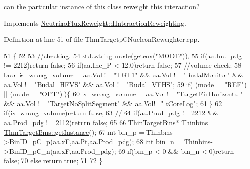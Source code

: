 can the particular instance of this class reweight this interaction? 



Implements \hyperlink{class_neutrino_flux_reweight_1_1_i_interaction_reweighting_aa3d1d3f37a93b02e447cf5eca333ac8d}{Neutrino\-Flux\-Reweight\-::\-I\-Interaction\-Reweighting}.



Definition at line 51 of file Thin\-Targetp\-C\-Nucleon\-Reweighter.\-cpp.


\begin{DoxyCode}
51                                                                           \{
52 
53     \textcolor{comment}{//checking:}
54     std::string mode(getenv(\textcolor{stringliteral}{"MODE"}));
55     \textcolor{keywordflow}{if}(aa.Inc\_pdg != 2212)\textcolor{keywordflow}{return} \textcolor{keyword}{false};
56     \textcolor{keywordflow}{if}(aa.Inc\_P < 12.0)\textcolor{keywordflow}{return} \textcolor{keyword}{false};
57     \textcolor{comment}{//volume check: }
58     \textcolor{keywordtype}{bool} is\_wrong\_volume = aa.Vol != \textcolor{stringliteral}{"TGT1"} && aa.Vol != \textcolor{stringliteral}{"BudalMonitor"} && aa.Vol != \textcolor{stringliteral}{"Budal\_HFVS"} && aa.Vol
       != \textcolor{stringliteral}{"Budal\_VFHS"};
59     \textcolor{keywordflow}{if}( (mode==\textcolor{stringliteral}{"REF"}) || (mode==\textcolor{stringliteral}{"OPT"}) )\{
60       is\_wrong\_volume = aa.Vol != \textcolor{stringliteral}{"TargetFinHorizontal"} && aa.Vol != \textcolor{stringliteral}{"TargetNoSplitSegment"} && aa.Vol!=\textcolor{stringliteral}{"
      tCoreLog"};
61     \}
62     \textcolor{keywordflow}{if}(is\_wrong\_volume)\textcolor{keywordflow}{return} \textcolor{keyword}{false};
63     \textcolor{comment}{//}
64     \textcolor{keywordflow}{if}(aa.Prod\_pdg != 2212 && aa.Prod\_pdg != 2112)\textcolor{keywordflow}{return} \textcolor{keyword}{false};
65     
66     ThinTargetBins*  Thinbins =  \hyperlink{class_neutrino_flux_reweight_1_1_thin_target_bins_aeff5cf7220dd08322f5abac2cbc7ff33}{ThinTargetBins::getInstance}();
67     \textcolor{keywordtype}{int} bin\_p      = Thinbins->BinID\_pC\_p(aa.xF,aa.Pt,aa.Prod\_pdg);
68     \textcolor{keywordtype}{int} bin\_n      = Thinbins->BinID\_pC\_n(aa.xF,aa.Prod\_pdg);
69     \textcolor{keywordflow}{if}(bin\_p < 0 && bin\_n < 0)\textcolor{keywordflow}{return} \textcolor{keyword}{false};
70     \textcolor{keywordflow}{else} \textcolor{keywordflow}{return} \textcolor{keyword}{true};
71     
72   \}
\end{DoxyCode}


